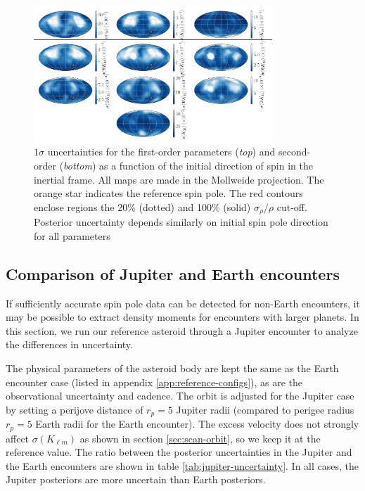 \documentclass[fleqn,usenatbib]{mnras}
\begin{document}
\begin{figure}
  \centering
  \includegraphics[width=0.8\textwidth]{figs/spin-pole.png}
  \caption{$1\sigma$ uncertainties for the first-order parameters (\textit{top}) and second-order (\textit{bottom}) as a function of the initial direction of spin in the inertial frame. All maps are made in the Mollweide projection. The orange star indicates the reference spin pole. The red contours enclose regions the 20\% (dotted) and 100\% (solid) $\sigma_\rho / \rho$ cut-off. Posterior uncertainty depends similarly on initial spin pole direction for all parameters}
  \label{fig:scan-spin}
\end{figure}


\subsection{Comparison of Jupiter and Earth encounters}
\label{sec:jupiter-earth}

If sufficiently accurate spin pole data can be detected for non-Earth encounters, it may be possible to extract density moments for encounters with larger planets. In this section, we run our reference asteroid through a Jupiter encounter to analyze the differences in uncertainty.

The physical parameters of the asteroid body are kept the same as the Earth encounter case (listed in appendix \ref{app:reference-configs}), as are the observational uncertainty and cadence. The orbit is adjusted for the Jupiter case by setting a perijove distance of $r_p=5$ Jupiter radii (compared to perigee radius $r_p=5$ Earth radii for the Earth encounter). The excess velocity does not strongly affect $\sigma(K_{\ell m})$ as shown in section \ref{sec:scan-orbit}, so we keep it at the reference value.
The ratio between the posterior uncertainties in the Jupiter and the Earth encounters are shown in table \ref{tab:jupiter-uncertainty}. In all cases, the Jupiter posteriors are more uncertain than Earth posteriors.
\end{document}
